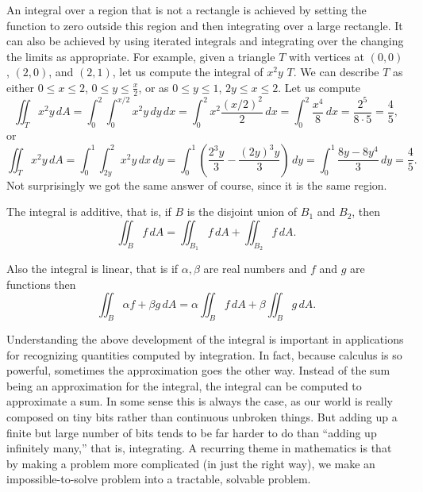\documentclass[11pt]{article}
\begin{document}
An integral over a region that is not a rectangle
is achieved by setting the function to zero
outside this region and then integrating over
a large rectangle.  It can also be achieved by
using iterated integrals and integrating over
the changing the limits as appropriate.  For example,
given a triangle $T$ with vertices at $(0,0)$, $(2,0)$,
and $(2,1)$, let us compute the integral of $x^2y$
$T$.  We can describe $T$ as either
$0 \leq x \leq 2$, $0 \leq y \leq \frac{x}{2}$, or as
$0 \leq y \leq 1$, $2y \leq x \leq 2$.  Let us compute
$$
\iint_T x^2 y \, dA
=
\int_0^2 \int_0^{x/2} x^2y \, dy \, dx
=
\int_0^2 x^2\frac{(x/2)^2}{2}  \, dx
=
\int_0^2 \frac{x^4}{8}  \, dx
=
 \frac{2^5}{8 \cdot 5} = \frac{4}{5} ,
$$
or
$$
\iint_T x^2 y \, dA
=
\int_0^1 \int_{2y}^{2} x^2y \, dx \, dy
=
\int_0^1 \left(\frac{2^3 y}{3} - \frac{(2y)^3y}{3} \right) \, dy
=
\int_0^1 \frac{8y-8y^4}{3} \, dy
=
\frac{4}{5} .
$$
Not surprisingly we got the same answer of course, since it is the same region.

The integral is additive, that is, if $B$ is the disjoint union of $B_1$ and $B_2$,
then
$$
\iint_B f \, dA = 
\iint_{B_1} f \, dA +
\iint_{B_2} f \, dA .
$$

Also the integral is linear, that is if $\alpha, \beta$ are real numbers and
$f$ and $g$ are functions then
$$
\iint_B \alpha f + \beta g \, dA = 
\alpha \iint_B f \, dA +
\beta \iint_B g \, dA .
$$

Understanding the above development of the integral is important
in applications for recognizing quantities computed by integration.
In fact, because calculus is
so powerful, sometimes the approximation goes the other way.
Instead of the sum being an approximation for the integral, the integral can be
computed to approximate a sum.
In some sense this is always the case, as our world is
really composed on tiny bits rather than continuous unbroken things.
But adding up a finite but large number of bits tends to be far harder to do than
``adding up infinitely many,'' that is, integrating.
A recurring theme in mathematics is that by making a problem more complicated
(in just the right way), we make an impossible-to-solve problem
into a tractable, solvable problem.
\end{document}

